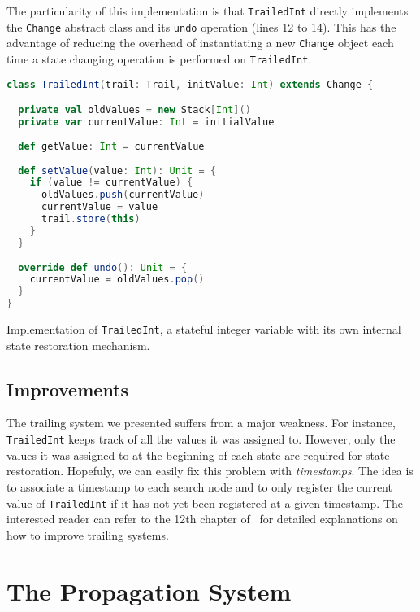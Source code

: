 \documentclass{llncs}
\begin{document}
The particularity of this implementation is that \texttt{TrailedInt} directly implements the \texttt{Change} abstract class and its \texttt{undo} operation (lines 12 to 14). 
This has the advantage of reducing the overhead of instantiating a new \texttt{Change} object each time a state changing operation is performed on \texttt{TrailedInt}.

\begin{code}
\begin{lstlisting}[language=scala, style=lineNumber]
class TrailedInt(trail: Trail, initValue: Int) extends Change { 

  private val oldValues = new Stack[Int]()
  private var currentValue: Int = initialValue 
  
  def getValue: Int = currentValue
  
  def setValue(value: Int): Unit = {
    if (value != currentValue) {
      oldValues.push(currentValue)
      currentValue = value
      trail.store(this)
    }
  }
  
  override def undo(): Unit = { 
    currentValue = oldValues.pop() 
  }
}
\end{lstlisting}
\caption{Implementation of \texttt{TrailedInt}, a stateful integer variable with its own internal state restoration mechanism.}
\label{code:trailedInt}
\end{code}

\subsection{Improvements}

The trailing system we presented suffers from a major weakness.
For instance, \texttt{TrailedInt} keeps track of all the values it was assigned to. 
However, only the values it was assigned to at the beginning of each state are required for state restoration.
Hopefuly, we can easily fix this problem with \emph{timestamps}.
The idea is to associate a timestamp to each search node and to only register the current value of \texttt{TrailedInt} if it has not yet been registered at a given timestamp.
The interested reader can refer to the 12th chapter of~\cite{handbook} for detailed explanations on how to improve trailing systems. 

\section{The Propagation System}
\label{sec:kiwipropagation}
\end{document}
